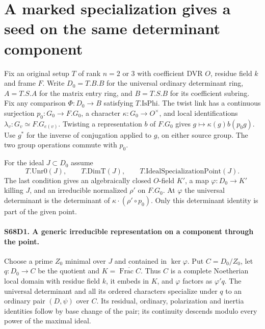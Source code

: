\section{A marked specialization gives a seed on the same determinant component}

Fix an original setup $T$ of rank $n=2$ or $3$ with coefficient DVR
$O$, residue field $k$ and frame $F$. Write $D_0=T.B.B$ for the
universal ordinary determinant ring, $A=T.S.A$ for the matrix entry
ring, and $B=T.S.B$ for its coefficient subring. Fix any comparison
$\Phi:D_0\to B$ satisfying $T.\mathrm{IsPhi}$. The twist link
has a continuous surjection $p_0:G_0\to F.G_0$, a character
$\kappa:G_0\to O^\times$, and local identifications
$\lambda_v:G_v\simeq F.G_{e(v)}$. Twisting a representation $b$
of $F.G_0$ gives $g\mapsto\kappa(g)b(p_0g)$. Use $g^*$ for
the inverse of conjugation applied to $g$, on either source group.
The two group operations commute with $p_0$.

For the ideal $J\subset D_0$ assume
\[
 T.\mathrm{Unr0}(J),\qquad T.\mathrm{DimT}(J),\qquad
 T.\mathrm{IdealSpecializationPoint}(J).
\]
The last condition gives an algebraically closed $O$-field $K'$,
a map $\varphi:D_0\to K'$ killing $J$, and an irreducible
normalized $\rho'$ on $F.G_0$. At $\varphi$ the universal
determinant is the determinant of $\kappa\cdot(\rho'\circ p_0)$.
Only this determinant identity is part of the given point.

\paragraph{S68D1. A generic irreducible representation on a component through the point.}
Choose a prime $Z_0$ minimal over $J$ and contained in $\ker\varphi$.
Put $C=D_0/Z_0$, let $q:D_0\to C$ be the quotient and
$K=\overline{\operatorname{Frac}C}$. Thus $C$ is a complete
Noetherian local domain with residue field $k$, it embeds in $K$,
and $\varphi$ factors as $\varphi' q$. The universal determinant
and all its ordered characters specialize under $q$ to an ordinary
pair $(D,\psi)$ over $C$. Its residual, ordinary, polarization
and inertia identities follow by base change of the pair; its
continuity descends modulo every power of the maximal ideal.

